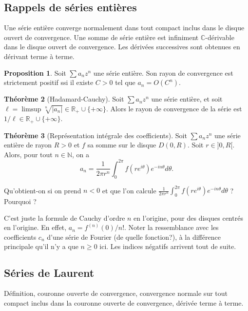 \documentclass[11pt,a4paper]{article}
\newcommand{\N}{\mathbb{N}}
\newcommand{\R}{\mathbb{R}}
\newcommand{\C}{\mathbb{C}}
\theoremstyle{definition}
\newtheorem{theoreme}{Th\'eor\`eme}[section]
\newtheorem{proposition}[theoreme]{Proposition}
\theoremstyle{plain}
\begin{document}
\subsection{Rappels de séries entières}

Une série entière converge normalement dans tout compact inclus dans le disque ouvert de convergence.
Une somme de série entière est infiniment $\C$-dérivable dans le disque ouvert de convergence. Les dérivées successives sont obtenues en dérivant terme à terme.

\begin{proposition}
Soit $\sum a_nz^n$ une série entière.
Son rayon de convergence est strictement positif  ssi il existe $C>0$ tel que $a_n = O\left(C^n\right)$.
\end{proposition}

\begin{theoreme}[Hadamard-Cauchy]
Soit $\sum a_nz^n$ une série entière, et soit $\ell = \limsup \sqrt[n]{|a_n|} \in \R_+\cup \{+\infty\}$.
Alors le rayon de convergence de la série est $1/\ell \in \R_+\cup \{+\infty\}$.
\end{theoreme}

\begin{theoreme}[Représentation intégrale des coefficients]
Soit $\sum a_nz^n$ une série entière de rayon $R>0$ et $f$ sa somme sur le disque $D(0,R)$.
Soit $r \in ]0,R[$.
Alors, pour tout $n\in\N$, on a 
\[a_n = \frac{1}{2\pi r^n}\int_0^{2\pi}f\left(re^{i\theta}\right)e^{-in\theta}d\theta. \]
\end{theoreme}

\begin{remarque}
Qu'obtient-on si on prend $n<0$ et que l'on calcule $\frac{1}{2\pi r^n}\int_0^{2\pi}f\left(re^{i\theta}\right)e^{-in\theta}d\theta$ ? Pourquoi ?
\end{remarque}

C'est juste la formule de Cauchy d'ordre $n$ en l'origine, pour des disques centrés en l'origine.  En effet, $a_n = f^{(n)}(0)/n!$.
Noter la ressemblance avec les coefficients \og $c_n$\fg{} d'une série de Fourier (de quelle fonction?), à la différence principale qu'il n'y a que $n\geq 0$ ici.
Les indices négatifs arrivent tout de suite.

\subsection{Séries de Laurent}

Définition, couronne ouverte de convergence, convergence normale sur tout compact inclus dans la couronne ouverte de convergence, dérivée terme à terme.
\end{document}
